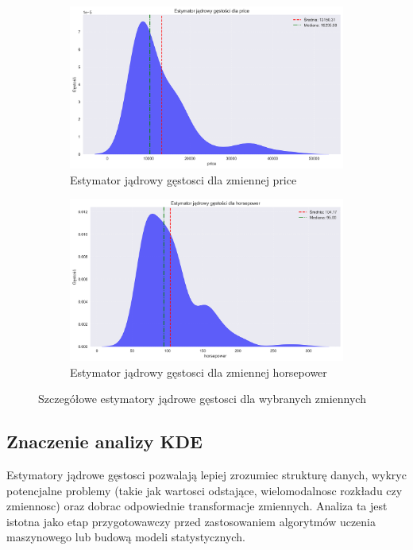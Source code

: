 \documentclass[12pt,a4paper]{article}
\begin{document}
\begin{figure}[H]
    \centering
    \begin{subfigure}[b]{0.48\textwidth}
        \includegraphics[width=\textwidth]{figures/kde_price.png}
        \caption{Estymator jądrowy gęstosci dla zmiennej price}
    \end{subfigure}
    \hfill
    \begin{subfigure}[b]{0.48\textwidth}
        \includegraphics[width=\textwidth]{figures/kde_horsepower.png}
        \caption{Estymator jądrowy gęstosci dla zmiennej horsepower}
    \end{subfigure}
    \caption{Szczegółowe estymatory jądrowe gęstosci dla wybranych zmiennych}
    \label{fig:kde_selected}
\end{figure}

\subsection{Znaczenie analizy KDE}

Estymatory jądrowe gęstosci pozwalają lepiej zrozumiec strukturę danych, wykryc potencjalne problemy (takie jak wartosci odstające, wielomodalnosc rozkładu czy zmiennosc) oraz dobrac odpowiednie transformacje zmiennych. Analiza ta jest istotna jako etap przygotowawczy przed zastosowaniem algorytmów uczenia maszynowego lub budową modeli statystycznych.
\end{document}
